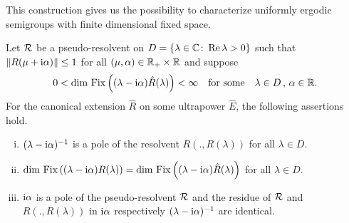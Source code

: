 This construction gives us the possibility to characterize uniformly ergodic semigroups with finite dimensional fixed space.
\begin{lemma}\label{lem:d3-2.2}
Let $\mathcal{R}$ be a pseudo-resolvent on $D = \{\lambda \in \mathbb{C} \colon \mathop{}\!\mathrm{Re}\,\lambda > 0\}$ such that $\|R(\mu+\mathrm{i}\alpha)\| \leq 1$ for all $(\mu,\alpha) \in \mathbb{R}_{+} \times \mathbb{R}$ and suppose
\[
0 < \dim \mathop{}\mathrm{Fix}\left((\lambda-\mathrm{i}\alpha)\hat{R}(\lambda)\right) < \infty \quad \text{for some} \quad \lambda \in D \, , \, \alpha \in \mathbb{R} .
\]
For the canonical extension $\hat{R}$ on some ultrapower $\hat{E}$, the following assertions hold.
\begin{enumerate}[(i)]
\item\label{d3-2.2-i}
$(\lambda - \mathrm{i}\alpha)^{-1}$ is a pole of the resolvent $R(.,R(\lambda))$ for all $\lambda \in D$.

\item\label{d3-2.2-ii}
$\dim \mathop{}\mathrm{Fix}\left((\lambda-\mathrm{i}\alpha)R(\lambda)\right) 
	= \dim \mathop{}\mathrm{Fix}\left((\lambda-\mathrm{i}\alpha)\hat{R}(\lambda)\right)$ for all $\lambda \in D$.

\item\label{d3-2.2-iii}
$\mathrm{i}\alpha$ is a pole of the pseudo-resolvent $\mathcal{R}$ and the residue of $\mathcal{R}$ and $R(.,R(\lambda))$ in $\mathrm{i}\alpha$ respectively $(\lambda - \mathrm{i}\alpha)^{-1}$ are identical.

\end{enumerate}
\end{lemma}
